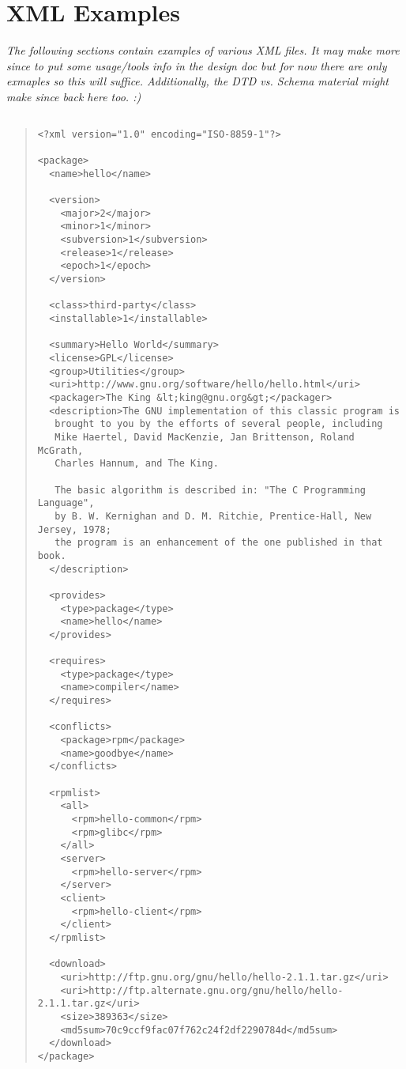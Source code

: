 %
%
%

\section{XML Examples}
\label{append:xml-overview}
\emph{The following sections contain examples of various XML files.  
It may make more since to put some usage/tools info in the design doc 
but for now there are only exmaples so this will suffice.
Additionally, the DTD vs. Schema material might make since back here
too.  :)}

\subsection{}
\begin{quote}
 \begin{small}
 \begin{verbatim}
<?xml version="1.0" encoding="ISO-8859-1"?>

<package>
  <name>hello</name>

  <version>
    <major>2</major>
    <minor>1</minor>
    <subversion>1</subversion>
    <release>1</release>
    <epoch>1</epoch>
  </version>

  <class>third-party</class>
  <installable>1</installable>

  <summary>Hello World</summary>
  <license>GPL</license>
  <group>Utilities</group>
  <uri>http://www.gnu.org/software/hello/hello.html</uri>
  <packager>The King &lt;king@gnu.org&gt;</packager>
  <description>The GNU implementation of this classic program is
   brought to you by the efforts of several people, including 
   Mike Haertel, David MacKenzie, Jan Brittenson, Roland McGrath, 
   Charles Hannum, and The King.

   The basic algorithm is described in: "The C Programming Language", 
   by B. W. Kernighan and D. M. Ritchie, Prentice-Hall, New Jersey, 1978;
   the program is an enhancement of the one published in that book.  
  </description>

  <provides>
    <type>package</type>
    <name>hello</name>
  </provides>

  <requires>
    <type>package</type>
    <name>compiler</name>
  </requires>

  <conflicts>
    <package>rpm</package>
    <name>goodbye</name>
  </conflicts>

  <rpmlist>
    <all>
      <rpm>hello-common</rpm>
      <rpm>glibc</rpm>
    </all>
    <server>
      <rpm>hello-server</rpm>
    </server>
    <client>
      <rpm>hello-client</rpm>
    </client>
  </rpmlist>

  <download>
    <uri>http://ftp.gnu.org/gnu/hello/hello-2.1.1.tar.gz</uri>
    <uri>http://ftp.alternate.gnu.org/gnu/hello/hello-2.1.1.tar.gz</uri>
    <size>389363</size>
    <md5sum>70c9ccf9fac07f762c24f2df2290784d</md5sum>
  </download>
</package>
\end{verbatim}
\end{small}
\end{quote}

